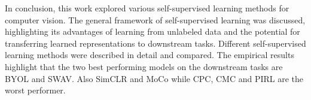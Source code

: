 In conclusion, this work explored various self-supervised learning methods for computer vision. The general framework of self-supervised learning was discussed, highlighting its advantages of learning from unlabeled data and the potential for transferring learned representations to downstream tasks. Different self-supervised learning methods were described in detail and compared. The empirical results highlight that the two best performing models on the downstream tasks are BYOL and SWAV. Also SimCLR and MoCo while CPC, CMC and PIRL are the worst performer. 